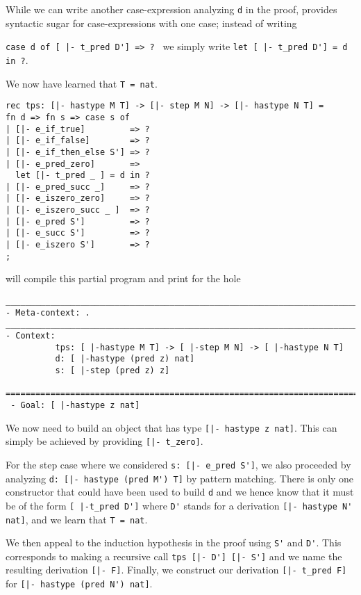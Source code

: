 While we can write another case-expression analyzing \lstinline!d! in the proof,
\beluga provides syntactic sugar for case-expressions with one case; instead of
writing

\noindent
\lstinline!case d of [ |- t_pred D'] => ? ! we simply write
\lstinline!let [ |- t_pred D'] = d in ?!.

\noindent
We now have learned that \lstinline!T = nat!.

\begin{lstlisting}
rec tps: [|- hastype M T] -> [|- step M N] -> [|- hastype N T] =
fn d => fn s => case s of
| [|- e_if_true]         => ?
| [|- e_if_false]        => ?
| [|- e_if_then_else S'] => ?
| [|- e_pred_zero]       =>
  let [|- t_pred _ ] = d in ?
| [|- e_pred_succ _]     => ?
| [|- e_iszero_zero]     => ?
| [|- e_iszero_succ _ ]  => ?
| [|- e_pred S']         => ?
| [|- e_succ S']         => ?
| [|- e_iszero S']       => ?
;
\end{lstlisting}

\beluga will compile this partial program and print for the hole

\begin{lstlisting}
________________________________________________________________________________
- Meta-context: .
________________________________________________________________________________
- Context:
          tps: [ |-hastype M T] -> [ |-step M N] -> [ |-hastype N T]
          d: [ |-hastype (pred z) nat]
          s: [ |-step (pred z) z]

================================================================================
 - Goal: [ |-hastype z nat]
\end{lstlisting}

We now need to build an object that has type \lstinline![|- hastype z nat]!.
This can simply be achieved by providing \lstinline![|- t_zero]!.

For the step case where we considered \lstinline!s: [|- e_pred S']!,
we also proceeded by analyzing \lstinline!d: [|- hastype (pred M') T]! by pattern
matching. There is only one constructor that could have been used to build
\lstinline!d! and we hence know that it must be of the form
\lstinline![ |-t_pred D']! where \lstinline!D'! stands for a derivation
\lstinline![|- hastype N' nat]!, and we learn that \lstinline!T = nat!.

We then appeal to the induction hypothesis in the proof using \lstinline!S'!
and \lstinline!D'!. This corresponds to making a recursive call
\lstinline!tps [|- D'] [|- S']! and we name the resulting derivation
\lstinline![|- F]!. Finally, we construct our derivation
\lstinline![|- t_pred F]! for \lstinline![|- hastype (pred N') nat]!.

